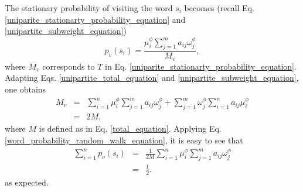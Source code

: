 \documentclass{article}
\begin{document}
The stationary probability of visiting the word $s_i$ becomes (recall Eq. \ref{uniparite_stationarty_probability_equation} and \ref{unipartite_subweight_equation})
\begin{equation}
p_{v}(s_i) = \frac{\mu_i^\phi \sum_{j=1}^m a_{ij} \omega_j^\phi}{M_{v}},
\label{word_probability_random_walk_equation}
\end{equation}
where $M_v$ corresponds to $T$ in Eq. \ref{uniparite_stationarty_probability_equation}. Adapting Eqs. \ref{unipartite_total_equation} and \ref{unipartite_subweight_equation}, one obtains 
\begin{eqnarray*}
M_{v} & = & \sum_{i=1}^n \mu_i^\phi \sum_{j=1}^m a_{ij} \omega_j^\phi + \sum_{j=1}^m \omega_j^\phi \sum_{i=1}^n a_{ij} \mu_i^\phi \\
      & = & 2 M,
\end{eqnarray*}
where $M$ is defined as in Eq. \ref{total_equation}. Applying Eq. \ref{word_probability_random_walk_equation}, it is easy to see that
\begin{eqnarray*}
\sum_{i=1}^n p_{v}(s_i) & = & \frac{1}{2M} \sum_{i=1}^n \mu_i^\phi \sum_{j=1}^m a_{ij} \omega_j^\phi \\
                        & = & \frac{1}{2}.
\end{eqnarray*}  
as expected.
\end{document}
